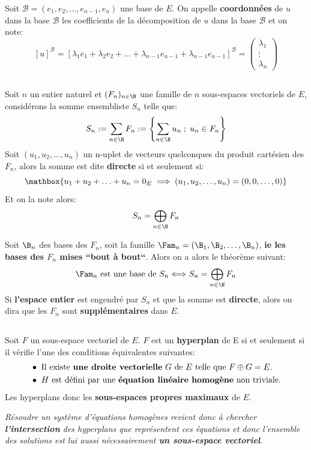 Soit \(\mathscr{B} = (e_1, e_2, \ldots, e_{n-1}, e_{n})\) une base de \(E\).\+
On appelle \textbf{coordonnées} de \(u\) dans la base \(\mathscr{B}\) les coefficients de la décomposition de \(u\) dans la base \(\mathscr{B}\) et on note:
\[
    [u]^{\mathscr{B}} = [\lambda_1 e_1 + \lambda_2 e_2 + \ldots + \lambda_{n-1} e_{n-1} + \lambda_{n-1} e_{n-1} ]^{\mathscr{B}} = 
    \begin{pmatrix}
        \lambda_1\\
        \vdots\\
        \lambda_{n}
    \end{pmatrix}
\]

\subsection*{}
Soit \(n\) un entier naturel et \((F_n)_{n \in \N}\) une famille de \(n\) sous-espaces vectoriels de \(E\), considérons la somme ensembliste \(S_n\) telle que:
\[
    S_n := \sum_{n\in\N} F_n := \Biggl\{ \sum_{n\in\N} u_n \; ; \; u_n \in F_n\Biggl\}
\]
Soit \((u_1, u_2, \ldots, u_n)\) un n-uplet de vecteurs quelconques du produit cartésien des \(F_n\), alors la somme est dite \textbf{directe} si et seulement si:
\[
    \mathbox{
        u_1 + u_2 + \ldots + u_n = 0_E \implies (u_1, u_2, \ldots, u_n) = (0, 0, \ldots, 0)
    }
\]
Et on la note alors:
\[
    S_n = \bigoplus_{n\in\N} F_n
\]

Soit \(\B_n\) des bases des \(F_n\), soit la famille \(\Fam_n = (\B_1, \B_2, \ldots, \B_n)\), \textbf{ie les bases des \(F_n\) mises ``bout à bout``}.\+
Alors on a alors le théorème suivant:
\begin{align*}
        \Fam_n \text{ est une base de } S_n \Longleftrightarrow S_n = \bigoplus_{n\in\N} F_n
\end{align*}
Si \textbf{l'espace entier} est engendré par \(S_n\) et que la somme est \textbf{directe}, alors on dira que les \(F_n\) sont \textbf{supplémentaires} dans \(E\).
    
\subsection*{}
Soit \(F\) un sous-espace vectoriel de \(E\).\+
\(F\) est un \textbf{hyperplan} de E si et seulement si il vérifie l'une des conditions équivalentes suivantes:
\begin{align*}
    &\bullet \text{ Il existe \textbf{une droite vectorielle} \(G\) de \(E\) telle que \(F \oplus G = E\).} \\
    &\bullet \text{ \(H\) est défini par une \textbf{équation linéaire homogène} non triviale.}
\end{align*}
Les hyperplans donc les \textbf{sous-espaces propres maximaux} de \(E\). \<

\begin{center}
    \textit{
        Résoudre un système d'équations homogènes revient donc à chercher \textbf{l'intersection} des hyperplans que représentent ces équations et donc l'ensemble des solutions est lui aussi nécessairement \textbf{un sous-espace vectoriel}.
    }
\end{center}
